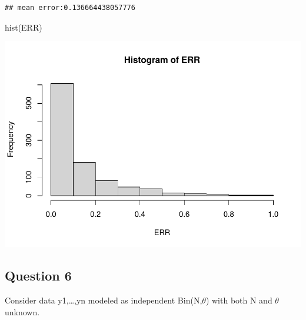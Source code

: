 \documentclass[
]{book}
\newenvironment{Shaded}{\begin{snugshade}}{\end{snugshade}}
\newcommand{\FunctionTok}[1]{\textcolor[rgb]{0.00,0.00,0.00}{#1}}
\newcommand{\NormalTok}[1]{#1}
\theoremstyle{definition}
\theoremstyle{definition}
\theoremstyle{definition}
\theoremstyle{definition}
\theoremstyle{remark}
\begin{document}
\begin{verbatim}
## mean error:0.136664438057776
\end{verbatim}

\begin{Shaded}
\begin{Highlighting}[]
 \FunctionTok{hist}\NormalTok{(ERR)}
\end{Highlighting}
\end{Shaded}

\includegraphics{_main_files/figure-latex/unnamed-chunk-42-1.pdf}

\hypertarget{question-6}{%
\subsection*{Question 6}\label{question-6}}

Consider data y1,\ldots,yn modeled as independent Bin(N,\(\theta\)) with both N and \(\theta\) unknown.
\end{document}
